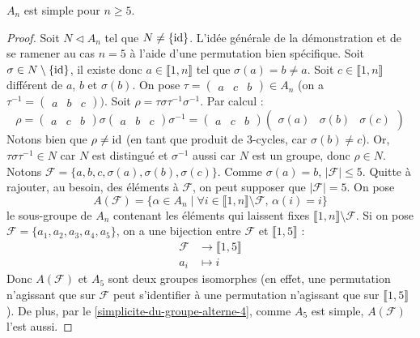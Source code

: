 	\begin{theorem}
		$A_n$ est simple pour $n \geq 5$.
	\end{theorem}

	\begin{proof}
		Soit $N \lhd A_n$ tel que $N \neq \{ \operatorname{id} \}$. L'idée générale de la démonstration et de se ramener au cas $n = 5$ à l'aide d'une permutation bien spécifique.
		\newpar
		Soit $\sigma \in N \setminus \{ \operatorname{id} \}$, il existe donc $a \in \llbracket 1, n \rrbracket$ tel que $\sigma(a) = b \neq a$. Soit $c \in \llbracket 1, n \rrbracket$ différent de $a$, $b$ et $\sigma(b)$. On pose $\tau = \begin{pmatrix} a & c & b \end{pmatrix} \in A_n$ (on a $\tau^{-1} = \begin{pmatrix} a & b & c \end{pmatrix})$. Soit $\rho = \tau \sigma \tau^{-1} \sigma^{-1}$. Par calcul :
		\[ \rho = \begin{pmatrix} a & c & b \end{pmatrix} \sigma \begin{pmatrix} a & b & c \end{pmatrix} \sigma^{-1} = \begin{pmatrix} a & c & b \end{pmatrix} \begin{pmatrix} \sigma(a) & \sigma(b) & \sigma(c) \end{pmatrix} \]
		Notons bien que $\rho \neq \operatorname{id}$ (en tant que produit de $3$-cycles, car $\sigma(b) \neq c$). Or, $\tau \sigma \tau^{-1} \in N$ car $N$ est distingué et $\sigma^{-1}$ aussi car $N$ est un groupe, donc $\rho \in N$.
		\newpar
		Notons $\mathcal{F} = \{ a, b, c, \sigma(a), \sigma(b), \sigma(c) \}$. Comme $\sigma(a) = b$, $|\mathcal{F}| \leq 5$. Quitte à rajouter, au besoin, des éléments à $\mathcal{F}$, on peut supposer que $|\mathcal{F}| = 5$. On pose
		\[ A(\mathcal{F}) = \{ \alpha \in A_n \mid \forall i \in \llbracket 1, n \rrbracket \setminus \mathcal{F}, \, \alpha(i) = i \} \]
		le sous-groupe de $A_n$ contenant les éléments qui laissent fixes $\llbracket 1, n \rrbracket \setminus \mathcal{F}$. Si on pose $\mathcal{F} = \{ a_1, a_2, a_3, a_4, a_5 \}$, on a une bijection entre $\mathcal{F}$ et $\llbracket 1, 5 \rrbracket$ :
		\begin{align*}
			\mathcal{F} &\rightarrow \llbracket 1, 5 \rrbracket \\
			a_i &\mapsto i
		\end{align*}
		Donc $A(\mathcal{F})$ et $A_5$ sont deux groupes isomorphes (en effet, une permutation n'agissant que sur $\mathcal{F}$ peut s'identifier à une permutation n'agissant que sur $\llbracket 1, 5 \rrbracket$). De plus, par le \cref{simplicite-du-groupe-alterne-4}, comme $A_5$ est simple, $A(\mathcal{F})$ l'est aussi.

\end{proof}
